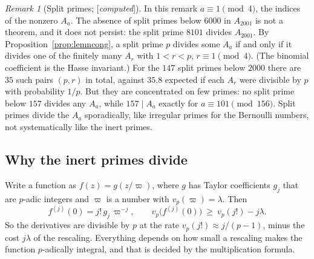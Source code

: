 \documentclass[11pt]{amsart}
\numberwithin{equation}{section}
\theoremstyle{definition}
\theoremstyle{remark}
\newtheorem{remark}[theorem]{Remark}
\newcommand{\status}[1]{\textup{[\emph{#1}]}}
\begin{document}
\begin{remark}[Split primes; \status{computed}]
In this remark $a\equiv1\pmod4$, the indices of the nonzero $A_a$. The absence of split primes below $6000$ in $A_{2001}$ is not a theorem, and it does not persist: the split prime $8101$ divides $A_{2001}$. By Proposition~\ref{prop:lemncong}, a split prime $p$ divides some $A_a$ if and only if it divides one of the finitely many $A_r$ with $1<r<p$, $r\equiv1\pmod4$. (The binomial coefficient is the Hasse invariant.) For the $147$ split primes below $2000$ there are $35$ such pairs $(p,r)$ in total, against $35.8$ expected if each $A_r$ were divisible by $p$ with probability $1/p$. But they are concentrated on few primes: no split prime below $157$ divides any $A_a$, while $157\mid A_a$ exactly for $a\equiv101\pmod{156}$. Split primes divide the $A_a$ sporadically, like irregular primes for the Bernoulli numbers, not systematically like the inert primes.
\end{remark}

\subsection*{Why the inert primes divide}
Write a function as $f(z)=g(z/\varpi)$, where $g$ has Taylor coefficients $g_j$ that are $p$-adic integers and $\varpi$ is a number with $v_p(\varpi)=\lambda$. Then
\begin{equation}
 f^{(j)}(0)=j!\,g_j\,\varpi^{-j},\qquad v_p\bigl(f^{(j)}(0)\bigr)\ \ge\ v_p(j!)-j\lambda .
\end{equation}
So the derivatives are divisible by $p$ at the rate $v_p(j!)\approx j/(p-1)$, minus the cost $j\lambda$ of the rescaling. Everything depends on how small a rescaling makes the function $p$-adically integral, and that is decided by the multiplication formula.
\end{document}
